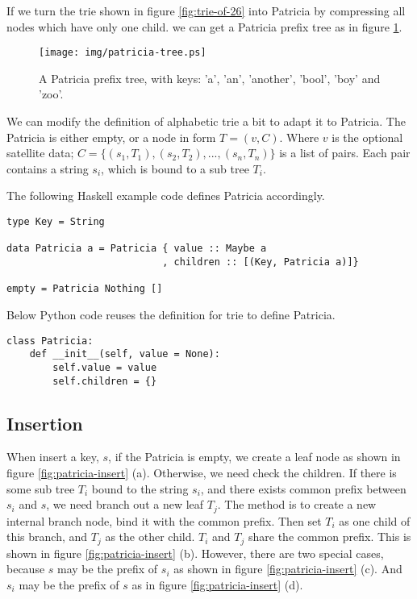 \documentclass[UTF8]{article}
\begin{document}
If we turn the trie shown in figure \ref{fig:trie-of-26} into Patricia
by compressing all nodes which have only one child. we can get
a Patricia prefix tree as in figure \ref{fig:patricia-tree}.

\begin{figure}[htbp]
  \centering
  \texttt{[image: img/patricia-tree.ps]}
  \caption{A Patricia prefix tree, with keys: 'a', 'an', 'another', 'bool',
    'boy' and 'zoo'.}
  \label{fig:patricia-tree}
\end{figure}

We can modify the definition of alphabetic trie a bit to adapt it
to Patricia. The Patricia is either empty, or a node in form $T = (v, C)$.
Where $v$ is the optional satellite data; $C = \{(s_1, T_1), (s_2, T_2), ..., (s_n, T_n)\}$
is a list of pairs. Each pair contains a string $s_i$, which is bound
to a sub tree $T_i$.

The following Haskell example code defines Patricia accordingly.

\lstset{language=Haskell}
\begin{lstlisting}
type Key = String

data Patricia a = Patricia { value :: Maybe a
                           , children :: [(Key, Patricia a)]}

empty = Patricia Nothing []
\end{lstlisting}

Below Python code reuses the definition for trie to define Patricia.

\lstset{language=Python}
\begin{lstlisting}
class Patricia:
    def __init__(self, value = None):
        self.value = value
        self.children = {}
\end{lstlisting}

\subsection{Insertion}

When insert a key, $s$, if the Patricia is empty, we
create a leaf node as shown in figure \ref{fig:patricia-insert} (a).
Otherwise, we need check the children.
If there is some sub tree $T_i$ bound to the string $s_i$,
and there exists common prefix between $s_i$ and $s$, we
need branch out a new leaf $T_j$. The method is to
create a new internal branch node, bind it with the common
prefix. Then set $T_i$ as one child of this branch, and
$T_j$ as the other child. $T_i$ and $T_j$ share the common
prefix. This is shown in figure \ref{fig:patricia-insert} (b).
However, there are two special cases, because $s$ may be the prefix of $s_i$
as shown in figure \ref{fig:patricia-insert} (c). And
$s_i$ may be the prefix of $s$ as in figure \ref{fig:patricia-insert} (d).
\end{document}
